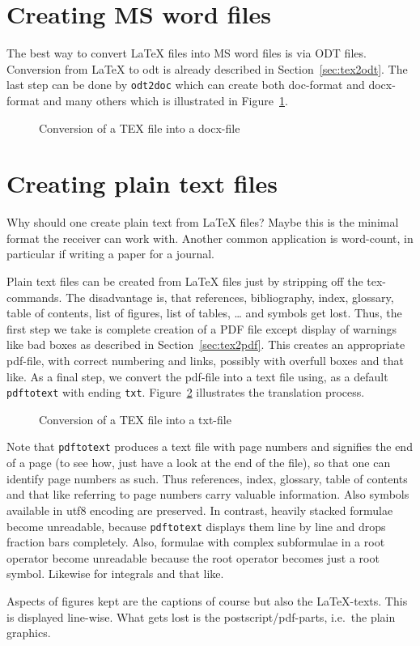 \section{Creating MS word files}\label{sec:tex2doc}

The best way to convert \LaTeX{} files into MS word files is via ODT files. 
Conversion from \LaTeX{} to odt 
is already described in Section~\ref{sec:tex2odt}. 
The last step can be done by \texttt{odt2doc} which can create both 
doc-format and docx-format and many others 
which is illustrated in Figure~\ref{fig:tex2doc}. 


\begin{figure}[htb]
\centering
{}
\caption{\label{fig:tex2doc}Conversion of a TEX file into a docx-file}
\end{figure}



\section{Creating plain text files}\label{sec:tex2txt}

Why should one create plain text from \LaTeX{} files? 
Maybe this is the minimal format the receiver can work with. 
Another common application is word-count, 
in particular if writing a paper for a journal. 

Plain text files can be created from \LaTeX{} files 
just by stripping off the tex-commands. 
The disadvantage is, 
that references, bibliography, index, glossary, 
table of contents, list of figures, list of tables, \dots 
and symbols get lost. 
Thus, the first step we take is complete creation of a PDF file 
except display of warnings like bad boxes 
as described in Section~\ref{sec:tex2pdf}. 
This creates an appropriate pdf-file, 
with correct numbering and links, 
possibly with overfull boxes and that like. 
As a final step, we convert the pdf-file into a text file 
using, as a default \texttt{pdftotext} with ending \texttt{txt}. 
Figure~\ref{fig:tex2txt} illustrates the translation process. 

\begin{figure}[htb]
\centering
{}
\caption{\label{fig:tex2txt}Conversion of a TEX file into a txt-file}
\end{figure}

Note that \texttt{pdftotext} produces a text file with page numbers 
and signifies the end of a page 
(to see how, just have a look at the end of the file), 
so that one can identify page numbers as such. 
Thus references, index, glossary, table of contents and that like 
referring to page numbers carry valuable information. 
Also symbols available in utf8 encoding are preserved. 
In contrast, heavily stacked formulae become unreadable, 
because \texttt{pdftotext} displays them line by line 
and drops fraction bars completely. 
Also, formulae with complex subformulae in a root operator  
become unreadable because the root operator becomes just a root symbol. 
Likewise for integrals and that like. 

Aspects of figures kept are the captions of course but also the \LaTeX-texts. 
This is displayed line-wise. 
What gets lost is the postscript/pdf-parts, i.e.~the plain graphics. 

\raggedbottom{}

